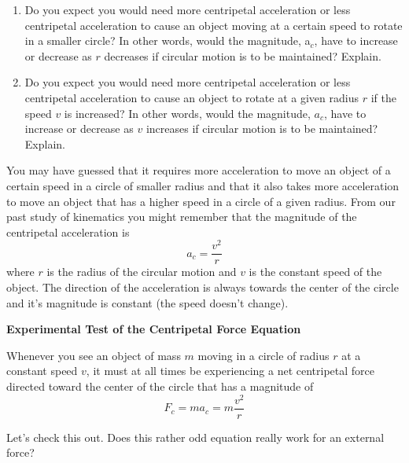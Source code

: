 \begin{enumerate}

\item Do you expect you would need more centripetal acceleration or less centripetal
acceleration to cause an object moving at a certain speed to rotate in a smaller
circle? In other words, would the magnitude, a\( _{c} \), have to increase
or decrease as $r$ decreases if circular motion is to be maintained? Explain.
\vspace{20mm}

\item Do you expect you would need more centripetal acceleration or less centripetal
acceleration to cause an object to rotate at a given radius $r$ if the speed $v$
is increased? In other words, would the magnitude, \( a_{c} \), have to increase
or decrease as $v$ increases if circular motion is to be maintained? Explain.
\vspace{20mm}

\end{enumerate}

You may have guessed that it requires more acceleration to move an object
of a certain speed in a circle of smaller radius and that it also takes more
acceleration to move an object that has a higher speed in a circle of a given
radius. From our past study of kinematics you might remember that the magnitude
of the centripetal acceleration is
\begin{equation}
a_{c}=\frac{v^{2}}{r}
\end{equation}
where $r$ is the radius of the circular motion and $v$ is the constant speed of the object.
The direction of the acceleration is always towards the center of the circle and it's magnitude is
constant (the speed doesn't change).


\textbf{Experimental Test of the Centripetal Force Equation }

Whenever you see an object of mass $m$ moving in a circle of
radius $r$ at a constant speed $v$, it must at all times be experiencing a net centripetal
force directed toward the center of the circle that has a magnitude of
\begin{equation}
F_{c}=ma_{c}=m\frac{v^{2}}{r}\label{eq:Fcent}
\end{equation}

Let's check this out. Does this rather odd equation really work for an external
force?

